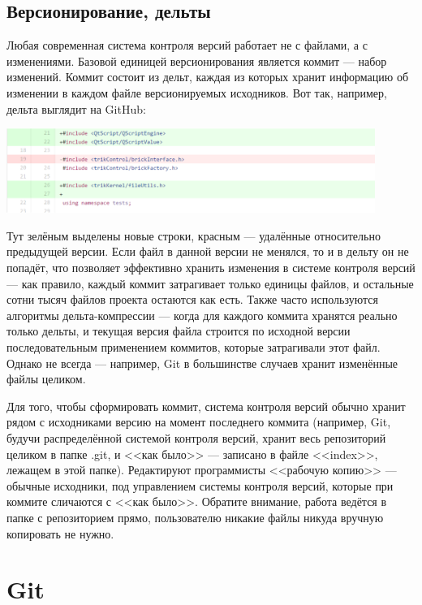 \documentclass{../text-style}
\begin{document}
\subsection{Версионирование, дельты}

Любая современная система контроля версий работает не с файлами, а с изменениями. Базовой единицей версионирования является коммит --- набор изменений. Коммит состоит из дельт, каждая из которых хранит информацию об изменении в каждом файле версионируемых исходников. Вот так, например, дельта выглядит на GitHub:

\begin{center}
    \includegraphics[width=0.9\textwidth]{delta.png}
\end{center}

Тут зелёным выделены новые строки, красным --- удалённые относительно предыдущей версии. Если файл в данной версии не менялся, то и в дельту он не попадёт, что позволяет эффективно хранить изменения в системе контроля версий --- как правило, каждый коммит затрагивает только единицы файлов, и остальные сотни тысяч файлов проекта остаются как есть. Также часто используются алгоритмы дельта-компрессии --- когда для каждого коммита хранятся реально только дельты, и текущая версия файла строится по исходной версии последовательным применением коммитов, которые затрагивали этот файл. Однако не всегда --- например, Git в большинстве случаев хранит изменённые файлы целиком.

Для того, чтобы сформировать коммит, система контроля версий обычно хранит рядом с исходниками версию на момент последнего коммита (например, Git, будучи распределённой системой контроля версий, хранит весь репозиторий целиком в папке .git, и <<как было>> --- записано в файле <<index>>, лежащем в этой папке). Редактируют программисты <<рабочую копию>> --- обычные исходники, под управлением системы контроля версий, которые при коммите сличаются с <<как было>>. Обратите внимание, работа ведётся в папке с репозиторием прямо, пользователю никакие файлы никуда вручную копировать не нужно.

\section{Git}
\end{document}
